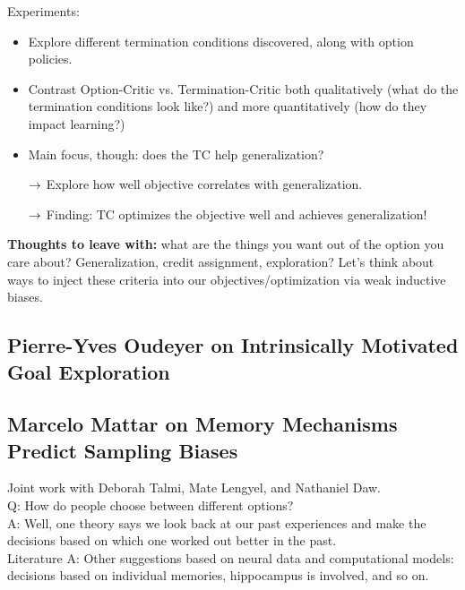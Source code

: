 Experiments:
\begin{itemize}
    \item Explore different termination conditions discovered, along with option policies.
    \item Contrast Option-Critic vs. Termination-Critic both qualitatively (what do the termination conditions look like?) and more quantitatively (how do they impact learning?)
    \item Main focus, though: does the TC help generalization?
    
    $\rightarrow$ Explore how well objective correlates with generalization.
    
    $\rightarrow$ Finding: TC optimizes the objective well and achieves generalization!
\end{itemize}

{\bf Thoughts to leave with:} what are the things you want out of the option you care about? Generalization, credit assignment, exploration? Let's think about ways to inject these criteria into our objectives/optimization via weak inductive biases.

\spacerule


\subsection{Pierre-Yves Oudeyer on Intrinsically Motivated Goal Exploration}


\spacerule

\subsection{Marcelo Mattar on Memory Mechanisms Predict Sampling Biases}

Joint work with Deborah Talmi, Mate Lengyel, and Nathaniel Daw. \\

Q: How do people choose between different options? \\

A: Well, one theory says we look back at our past experiences and make the decisions based on which one worked out better in the past. \\

Literature A: Other suggestions based on neural data and computational models: decisions based on individual memories, hippocampus is involved, and so on. \\

